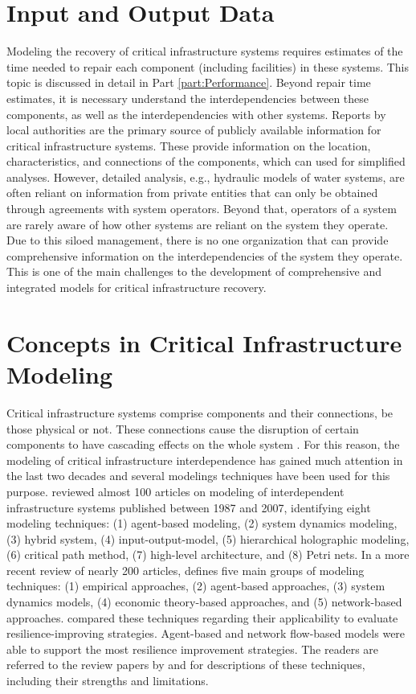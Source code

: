 \section{Input and Output Data}
Modeling the recovery of critical infrastructure systems requires estimates of the time needed to repair each component (including facilities) in these systems. This topic is discussed in detail in Part \ref{part:Performance}. Beyond repair time estimates, it is necessary understand the interdependencies between these components, as well as the interdependencies with other systems. Reports by local authorities are the primary source of publicly available information for critical infrastructure systems. These provide information on the location, characteristics, and connections of the components, which can used for simplified analyses. However, detailed analysis, e.g., hydraulic models of water systems, are often reliant on information from private entities that can only be obtained through agreements with system operators. Beyond that, operators of a system are rarely aware of how other systems are reliant on the system they operate. Due to this siloed management, there is no one organization that can provide comprehensive information on the interdependencies of the system they operate. This is one of the main challenges to the development of comprehensive and integrated models for critical infrastructure recovery.\ 

\section{Concepts in Critical Infrastructure Modeling}
Critical infrastructure systems comprise components and their connections, be those physical or not. These connections cause the disruption of certain components to have cascading effects on the whole system \citep{rinaldi2001identifying}. For this reason, the modeling of critical infrastructure interdependence has gained much attention in the last two decades and several modelings techniques have been used for this purpose. \cite{Eusgeld2008a} reviewed almost 100 articles on modeling of interdependent infrastructure systems published between 1987 and 2007, identifying eight modeling techniques: (1) agent-based modeling, (2) system dynamics modeling, (3) hybrid system, (4) input-output-model, (5) hierarchical holographic modeling, (6) critical path method, (7) high-level architecture, and (8) Petri nets. In a more recent review of nearly 200 articles, \cite{Ouyang2014a} defines five main groups of modeling techniques: (1) empirical approaches, (2) agent-based approaches, (3) system dynamics models, (4) economic theory-based approaches, and (5) network-based approaches. \cite{Ouyang2014a} compared these techniques regarding their applicability to evaluate resilience-improving strategies. Agent-based and network flow-based models were able to support the most resilience improvement strategies. The readers are referred to the review papers by \cite{Eusgeld2008a} and \cite{Ouyang2014a} for descriptions of these techniques, including their strengths and limitations. \ 

